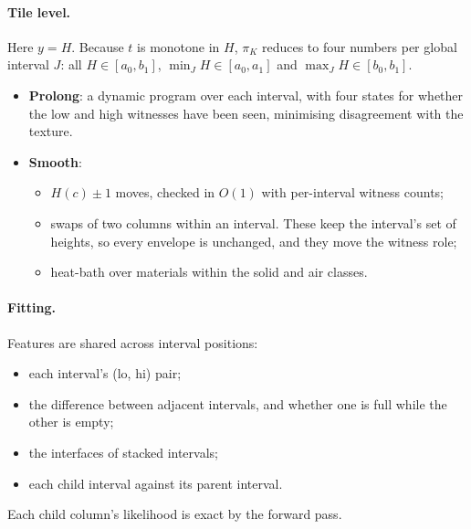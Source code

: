 \documentclass[11pt]{article}
\newcommand{\1}{\mathds{1}}
\begin{document}
\paragraph{Tile level.} Here $y = H$. Because $t$ is monotone in $H$, $\pi_K$ reduces to four
numbers per global interval $J$: all $H \in [a_0, b_1]$, $\min_J H \in [a_0, a_1]$ and
$\max_J H \in [b_0, b_1]$.
\begin{itemize}
  \item \textbf{Prolong}: a dynamic program over each interval, with four states for whether
        the low and high witnesses have been seen, minimising disagreement with the texture.
  \item \textbf{Smooth}:
        \begin{itemize}
          \item $H(c) \pm 1$ moves, checked in $O(1)$ with per-interval witness counts;
          \item swaps of two columns within an interval. These keep the interval's set of
                heights, so every envelope is unchanged, and they move the witness role;
          \item heat-bath over materials within the solid and air classes.
        \end{itemize}
\end{itemize}

\paragraph{Fitting.} Features are shared across interval positions:
\begin{itemize}
  \item each interval's (lo, hi) pair;
  \item the difference between adjacent intervals, and whether one is full while the other is
        empty;
  \item the interfaces of stacked intervals;
  \item each child interval against its parent interval.
\end{itemize}
Each child column's likelihood is exact by the forward pass.
\end{document}
